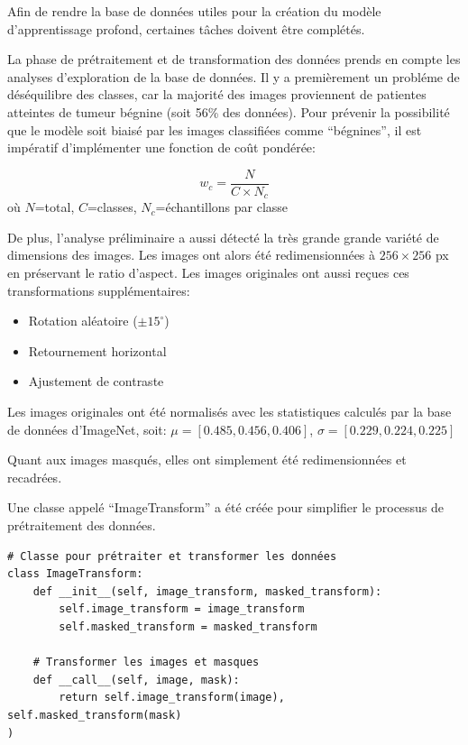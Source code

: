 \documentclass[a4paper,12pt]{article}
\begin{document}
Afin de rendre la base de données utiles pour la création du modèle d'apprentissage profond, certaines tâches doivent être complétés.

La phase de prétraitement et de transformation des données prends en compte les analyses d'exploration de la base de données. Il y a premièrement un probléme de déséquilibre des classes, car la majorité des images proviennent de patientes atteintes de tumeur bégnine (soit 56\% des données). Pour prévenir la possibilité que le modèle soit biaisé par les images classifiées comme \enquote{bégnines}, il est impératif d'implémenter une fonction de coût pondérée:

\begin{equation}
        w_c = \frac{N}{C \times N_c}
    \end{equation}
où $N$=total, $C$=classes, $N_c$=échantillons par classe

De plus, l'analyse préliminaire a aussi détecté la très grande grande variété de dimensions des images. Les images ont alors été redimensionnées à $256\times256$ px en préservant le ratio d'aspect. Les images originales ont aussi reçues ces transformations supplémentaires:

\begin{itemize}
        \item Rotation aléatoire ($\pm15^\circ$)
        \item Retournement horizontal
        \item Ajustement de contraste
\end{itemize}

Les images originales ont été normalisés avec les statistiques calculés par la base de données d'ImageNet, soit: $\mu=[0.485,0.456,0.406]$, $\sigma=[0.229,0.224,0.225]$

Quant aux images masqués, elles ont simplement été redimensionnées et recadrées.

Une classe appelé \enquote{ImageTransform} a été créée pour simplifier le processus de prétraitement des données.

\begin{verbatim}
# Classe pour prétraiter et transformer les données
class ImageTransform:
    def __init__(self, image_transform, masked_transform):
        self.image_transform = image_transform
        self.masked_transform = masked_transform

    # Transformer les images et masques
    def __call__(self, image, mask):
        return self.image_transform(image), self.masked_transform(mask)
)
\end{verbatim}
\end{document}
